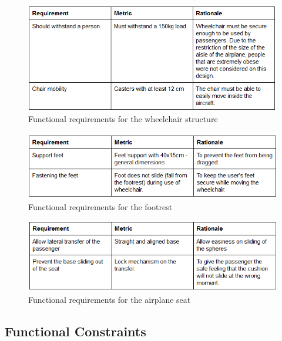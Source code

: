 \newpage

\begin{figure}[h!]
  \centering
     \includegraphics[scale=1]{images/functional_requirements_wheelchair_structure.png}
   \caption{Functional requirements for the wheelchair structure}
  \label{fig:fun_req_wheelchair_structure}
\end{figure}

\newpage

\begin{figure}[h!]
  \centering
     \includegraphics[scale=1]{images/functional_requirements_footrest.png}
   \caption{Functional requirements for the footrest}
  \label{fig:fun_req_footrest}
\end{figure}

\newpage

\begin{figure}[h!]
  \centering
     \includegraphics[scale=1]{images/functional_requirements_airplane_seat.png}
   \caption{Functional requirements for the airplane seat}
  \label{fig:fun_req_airplane_seat}
\end{figure}

\newpage

\subsection{Functional Constraints}

